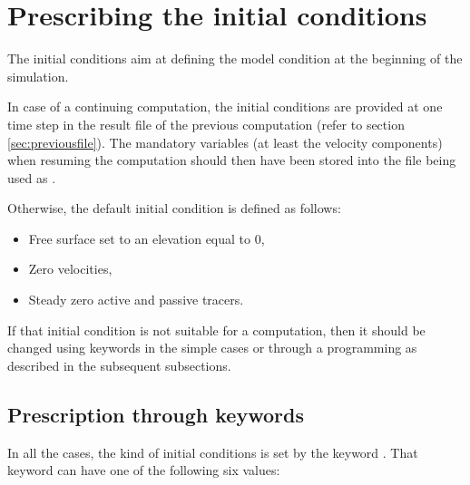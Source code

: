 \section{Prescribing the initial conditions}

The initial conditions aim at defining the model condition at the beginning of
the simulation.

In case of a continuing computation, the initial conditions are provided at one
time step in the result file of the previous computation (refer to section
\ref{sec:previousfile}).
The mandatory variables (at least the velocity components) when resuming
the computation should then have been stored into the file being used as
.

Otherwise, the default initial condition is defined as follows:

\begin{itemize}
\item Free surface set to an elevation equal to 0,

\item Zero velocities,

\item Steady zero active and passive tracers.
\end{itemize}

If that initial condition is not suitable for a computation, then it should be
changed using keywords in the simple cases or through a programming as
described in the subsequent subsections.


\subsection{Prescription through keywords}

In all the cases, the kind of initial conditions is set by the keyword
. That keyword can have one of the following six
values:

